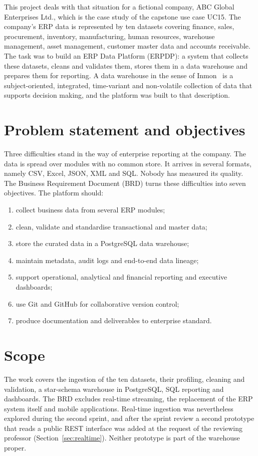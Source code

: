 \documentclass[12pt,a4paper]{report}
\begin{document}
This project deals with that situation for a fictional company, ABC Global Enterprises Ltd., which is the case study of the capstone use case UC15. The company's ERP data is represented by ten datasets covering finance, sales, procurement, inventory, manufacturing, human resources, warehouse management, asset management, customer master data and accounts receivable. The task was to build an ERP Data Platform (ERPDP): a system that collects these datasets, cleans and validates them, stores them in a data warehouse and prepares them for reporting. A data warehouse in the sense of Inmon~\cite{inmon} is a subject-oriented, integrated, time-variant and non-volatile collection of data that supports decision making, and the platform was built to that description.

\section{Problem statement and objectives}
Three difficulties stand in the way of enterprise reporting at the company. The data is spread over modules with no common store. It arrives in several formats, namely CSV, Excel, JSON, XML and SQL. Nobody has measured its quality. The Business Requirement Document (BRD) turns these difficulties into seven objectives. The platform should:
\begin{enumerate}
\item collect business data from several ERP modules;
\item clean, validate and standardise transactional and master data;
\item store the curated data in a PostgreSQL data warehouse;
\item maintain metadata, audit logs and end-to-end data lineage;
\item support operational, analytical and financial reporting and executive dashboards;
\item use Git and GitHub for collaborative version control;
\item produce documentation and deliverables to enterprise standard.
\end{enumerate}

\section{Scope}
The work covers the ingestion of the ten datasets, their profiling, cleaning and validation, a star-schema warehouse in PostgreSQL, SQL reporting and dashboards. The BRD excludes real-time streaming, the replacement of the ERP system itself and mobile applications. Real-time ingestion was nevertheless explored during the second sprint, and after the sprint review a second prototype that reads a public REST interface was added at the request of the reviewing professor (Section~\ref{sec:realtime}). Neither prototype is part of the warehouse proper.
\end{document}
